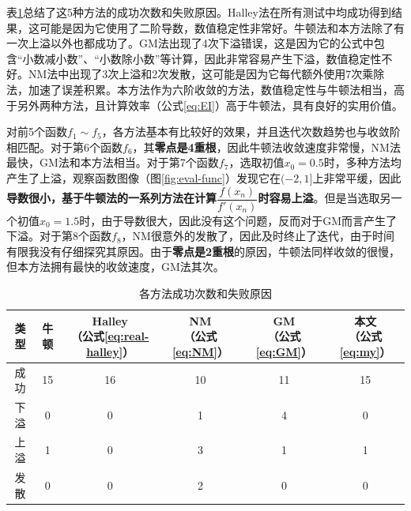 表\ref{tab:exp-summary}总结了这5种方法的成功次数和失败原因。Halley法在所有测试中均成功得到结果，这可能是因为它使用了二阶导数，数值稳定性非常好。牛顿法和本方法除了有一次上溢以外也都成功了。GM法出现了4次下溢错误，这是因为它的公式中包含“小数减小数”、“小数除小数”等计算，因此非常容易产生下溢，数值稳定性不好。NM法中出现了3次上溢和2次发散，这可能是因为它每代额外使用7次乘除法，加速了误差积累。本方法作为六阶收敛的方法，数值稳定性与牛顿法相当，高于另外两种方法，且计算效率（公式\ref{eq:EI}）高于牛顿法，具有良好的实用价值。

对前5个函数$f_1\sim f_5$，各方法基本有比较好的效果，并且迭代次数趋势也与收敛阶相匹配。对于第6个函数$f_6$，其\textbf{零点是4重根}，因此牛顿法收敛速度非常慢，NM法最快，GM法和本方法相当。对于第7个函数$f_7$，选取初值$x_0=0.5$时，多种方法均产生了上溢，观察函数图像（图\ref{fig:eval-func}）发现它在$(-2, 1]$上非常平缓，因此\textbf{导数很小，基于牛顿法的一系列方法在计算$\dfrac{f(x_n)}{f'(x_n)}$时容易上溢}。但是当选取另一个初值$x_0=1.5$时，由于导数很大，因此没有这个问题，反而对于GM而言产生了下溢。对于第8个函数$f_8$，NM很意外的发散了，因此及时终止了迭代，由于时间有限我没有仔细探究其原因。由于\textbf{零点是2重根}的原因，牛顿法同样收敛的很慢，但本方法拥有最快的收敛速度，GM法其次。



\begin{table}[!htbp]
    \centering
    \caption{各方法成功次数和失败原因}
    \label{tab:exp-summary}
    \begin{tabular}{c|ccccc}
        \toprule
        类型 & 牛顿 & \makecell[c]{Halley\\（公式\ref{eq:real-halley}）} & \makecell[c]{NM\cite{neta1979sixth}\\（公式\ref{eq:NM}）} & \makecell[c]{GM\cite{grau2006improvement}\\（公式\ref{eq:GM}）} & \makecell[c]{本文\\（公式\ref{eq:my}）} \\
        \midrule
        成功 & 15 & 16 & 10 & 11 & 15 \\
        下溢 & 0  & 0  & 1  & 4  & 0 \\
        上溢 & 1  & 0  & 3  & 1  & 1 \\
        发散 & 0  & 0  & 2  & 0  & 0 \\
        \bottomrule
    \end{tabular}
\end{table}




